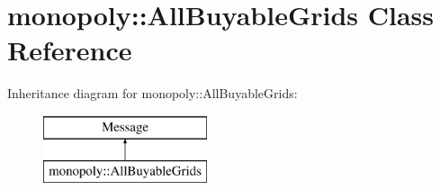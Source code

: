 \hypertarget{classmonopoly_1_1_all_buyable_grids}{}\section{monopoly\+:\+:All\+Buyable\+Grids Class Reference}
\label{classmonopoly_1_1_all_buyable_grids}
Inheritance diagram for monopoly\+:\+:All\+Buyable\+Grids\+:\begin{figure}[H]
\begin{center}
\leavevmode
\includegraphics[height=2.000000cm]{classmonopoly_1_1_all_buyable_grids}
\end{center}
\end{figure}
